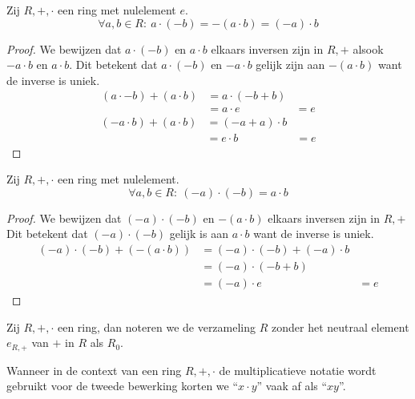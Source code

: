 \documentclass[main.tex]{subfiles}
\begin{document}
\begin{ei}
  \label{ei:min-door-maal}
  Zij $R,+,\cdot$ een ring met nulelement $e$. 
  \[ \forall a,b \in R:\ a \cdot (-b) = -(a \cdot b) = (-a) \cdot b \]
 
  \begin{proof}
    We bewijzen dat $a \cdot (-b)$ en $a \cdot b$ elkaars inversen zijn in $R,+$ alsook $-a \cdot b$ en $a \cdot b$.
    Dit betekent dat $a \cdot (-b)$ en $-a \cdot b$ gelijk zijn aan $-(a \cdot b)$ want de inverse is uniek.
    \[
    \begin{array}{rll}
      (a \cdot -b) + (a \cdot b) &= a \cdot (-b + b) &\\
                                 &= a \cdot e &= e 
    \end{array}
    \]  
    \[
    \begin{array}{rll}
      (-a \cdot b) + (a \cdot b) &= (-a + a) \cdot b &\\
                                 &= e \cdot b &= e 
    \end{array}
    \]      
  \end{proof}
\end{ei}

\begin{ei}
  Zij $R,+,\cdot$ een ring met nulelement.
  \[ \forall a,b \in R:\ (-a) \cdot (-b) = a \cdot b \]

  \begin{proof}
    We bewijzen dat $(-a) \cdot (-b)$ en $-(a \cdot b)$ elkaars inversen zijn in $R,+$
    Dit betekent dat $(-a) \cdot (-b)$ gelijk is aan $a \cdot b$ want de inverse is uniek.
    \[
    \begin{array}{rll}
      (-a) \cdot (-b) + (- (a \cdot b)) &= (-a) \cdot (-b) + (-a) \cdot b &\\
                                        &= (-a) \cdot (-b + b) &\\
                                        &= (-a) \cdot e &= e
    \end{array}
    \]
  \end{proof}
\end{ei}

\begin{de}
  Zij $R,+,\cdot$ een ring, dan noteren we de verzameling $R$ zonder het neutraal element $e_{R,+}$ van $+$ in $R$ als $R_{0}$.
\end{de}

\begin{de}
  Wanneer in de context van een ring $R,+,\cdot$ de multiplicatieve notatie wordt gebruikt voor de tweede bewerking korten we ``$x \cdot y$'' vaak af als ``$xy$''.
\end{de}
\end{document}
